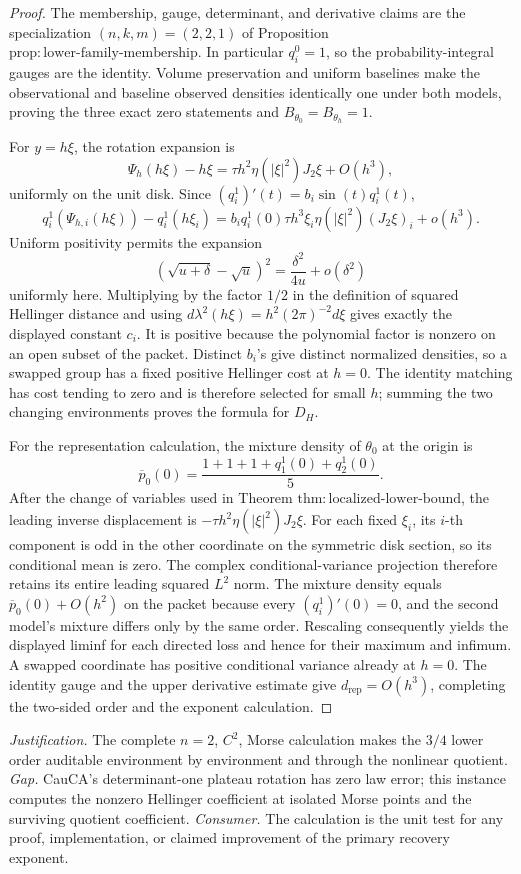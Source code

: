 \documentclass{article}
\begin{document}
\begin{proof}
The membership, gauge, determinant, and derivative claims are the specialization \((n,k,m)=(2,2,1)\) of Proposition \(\mathrm{prop:lower\text{-}family\text{-}membership}\). In particular \(q_i^0=1\), so the probability-integral gauges are the identity. Volume preservation and uniform baselines make the observational and baseline observed densities identically one under both models, proving the three exact zero statements and \(B_{\theta_0}=B_{\theta_h}=1\).

For \(y=h\xi\), the rotation expansion is
\[
\Psi_h(h\xi)-h\xi
=\tau h^2\eta(|\xi|^2)J_2\xi+O(h^3),
\]
uniformly on the unit disk. Since \((q_i^1)'(t)=b_i\sin(t)q_i^1(t)\),
\[
q_i^1(\Psi_{h,i}(h\xi))-q_i^1(h\xi_i)
=b_iq_i^1(0)\tau h^3\xi_i\eta(|\xi|^2)(J_2\xi)_i+o(h^3).
\]
Uniform positivity permits the expansion
\[
(\sqrt{u+\delta}-\sqrt u)^2=\frac{\delta^2}{4u}+o(\delta^2)
\]
uniformly here. Multiplying by the factor \(1/2\) in the definition of squared Hellinger distance and using \(d\lambda^2(h\xi)=h^2(2\pi)^{-2}d\xi\) gives exactly the displayed constant \(c_i\). It is positive because the polynomial factor is nonzero on an open subset of the packet. Distinct \(b_i\)'s give distinct normalized densities, so a swapped group has a fixed positive Hellinger cost at \(h=0\). The identity matching has cost tending to zero and is therefore selected for small \(h\); summing the two changing environments proves the formula for \(D_H\).

For the representation calculation, the mixture density of \(\theta_0\) at the origin is
\[
\overline p_0(0)=\frac{1+1+1+q_1^1(0)+q_2^1(0)}5.
\]
After the change of variables used in Theorem \(\mathrm{thm:localized\text{-}lower\text{-}bound}\), the leading inverse displacement is
\(-\tau h^2\eta(|\xi|^2)J_2\xi\). For each fixed \(\xi_i\), its \(i\)-th component is odd in the other coordinate on the symmetric disk section, so its conditional mean is zero. The complex conditional-variance projection therefore retains its entire leading squared \(L^2\) norm. The mixture density equals \(\overline p_0(0)+O(h^2)\) on the packet because every \((q_i^1)'(0)=0\), and the second model's mixture differs only by the same order. Rescaling consequently yields the displayed liminf for each directed loss and hence for their maximum and infimum. A swapped coordinate has positive conditional variance already at \(h=0\). The identity gauge and the upper derivative estimate give \(d_{\mathrm{rep}}=O(h^3)\), completing the two-sided order and the exponent calculation.
\end{proof}
\par\smallskip\noindent \textit{Justification.} The complete \(n=2\), \(C^2\), Morse calculation makes the \(3/4\) lower order auditable environment by environment and through the nonlinear quotient. \textit{Gap.} CauCA's determinant-one plateau rotation has zero law error; this instance computes the nonzero Hellinger coefficient at isolated Morse points and the surviving quotient coefficient. \textit{Consumer.} The calculation is the unit test for any proof, implementation, or claimed improvement of the primary recovery exponent.
\end{document}

